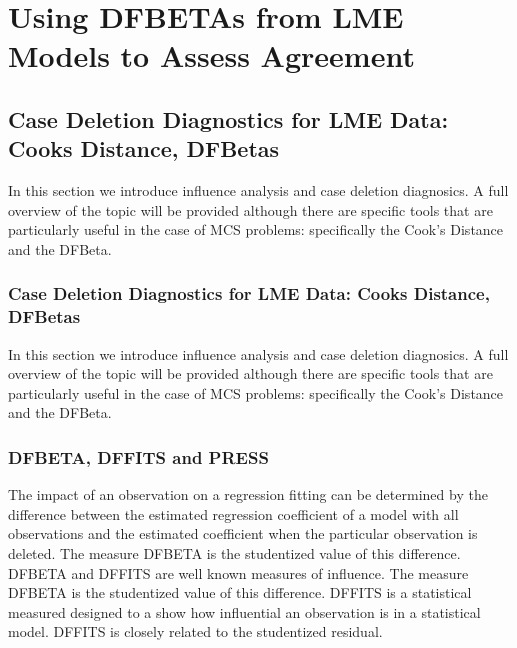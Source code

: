 \documentclass[12pt, a4paper]{report}
\theoremstyle{plain}
\theoremstyle{definition}
\theoremstyle{remark}
\begin{document}
	
\section{Using DFBETAs from LME Models to Assess Agreement}
	

	
\subsection*{Case Deletion Diagnostics for LME Data: Cooks Distance, DFBetas}

	In this section we introduce influence analysis and case deletion diagnosics. A full overview of the topic will be provided although there are specific tools that are particularly useful in the case of MCS problems: specifically the Cook's Distance and the DFBeta.
	
	\subsubsection*{Case Deletion Diagnostics for LME Data: Cooks Distance, DFBetas}
	In this section we introduce influence analysis and case deletion diagnosics. A full overview of the topic will be provided although there are specific tools that are particularly useful in the case of MCS problems: specifically the Cook's Distance and the DFBeta.
	

	\subsubsection{DFBETA, DFFITS and PRESS}
	The impact of an observation on a regression fitting can be determined by the difference between the estimated regression coefficient of a model with all observations and the estimated coefficient when the particular observation is deleted. The measure DFBETA is the studentized value of this difference.
	DFBETA and DFFITS are well known measures of influence. The measure DFBETA is the studentized value of this difference. DFFITS is a statistical measured designed to a show how influential an observation is in a statistical model. DFFITS is closely related to the studentized residual.
	
	
\end{document}
